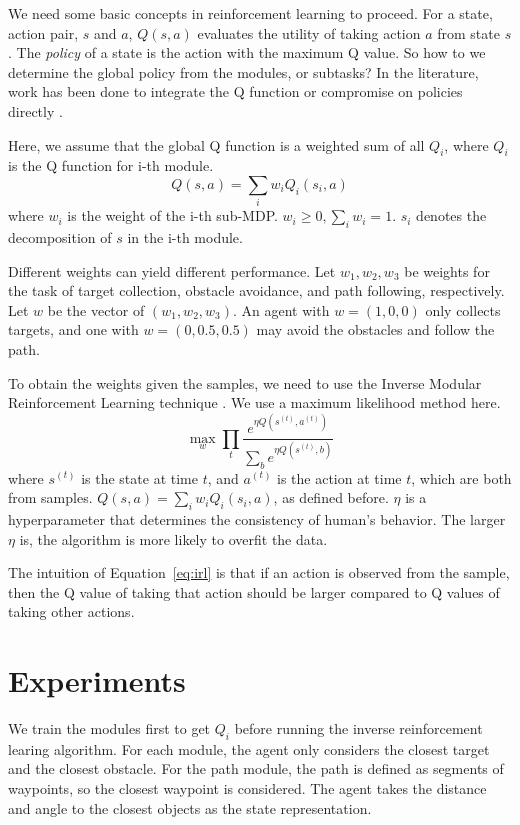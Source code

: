 \documentclass[11pt]{article} %
\begin{document}
We need some basic concepts in reinforcement learning to proceed. For a state, action
pair, $s$ and $a$, $Q(s, a)$ evaluates the utility of taking action $a$ from
state $s$. The {\em policy} of a state is the action with the maximum Q
value\cite{rl}. So how to we determine the global policy from the modules, or
subtasks? In the literature, work has been done to integrate the Q function
\cite{koller1999computing} or compromise on policies directly
\cite{thomas2012motor}.

Here, we assume that the global Q function is a weighted sum of all $Q_i$, where
$Q_i$ is the Q function for i-th module.
$$Q(s, a) = \sum_i w_i Q_i (s_i, a)$$
where $w_i$ is the weight of the i-th sub-MDP. $w_i \geq 0, \sum_i w_i = 1$.
$s_i$ denotes the decomposition of $s$ in the i-th module.

Different weights can yield different performance. Let $w_1, w_2, w_3$ be
weights for the task of target collection, obstacle avoidance, and path
following, respectively. Let $w$ be the vector of $(w_1, w_2, w_3)$. An agent
with $w = (1, 0, 0)$ only collects targets, and one with $w = (0, 0.5, 0.5)$ may
avoid the obstacles and follow the path.

To obtain the weights given the samples, we need to use the Inverse Modular
Reinforcement Learning technique \cite{rothkopf2013modular}. We use a maximum
likelihood method here.
\begin{equation}
\label{eq:irl}
\max_w \prod_t \frac{e^{\eta Q(s^{(t)}, a^{(t)})}}{\sum_b e^{\eta Q(s^{(t)}, b)}}
\end{equation}
where $s^{(t)}$ is the state at time $t$, and $a^{(t)}$ is the action at time
$t$, which are both from samples. $Q(s, a) = \sum_i w_i Q_i(s_i, a)$, as defined
before. $\eta$ is a hyperparameter that determines the consistency of human's
behavior. The larger $\eta$ is, the algorithm is more likely to overfit the data.

The intuition of Equation~\ref{eq:irl} is that if an action is observed from the
sample, then the Q value of taking that action should be larger compared to Q
values of taking other actions.

\section{Experiments}
\label{sec:exp}

We train the modules first to get $Q_i$ before running the inverse reinforcement
learing algorithm. For each module, the agent only considers the closest target
and the closest obstacle. For the path module, the path is defined as segments
of waypoints, so the closest waypoint is considered. The agent takes the
distance and angle to the closest objects as the state representation.
\end{document}
